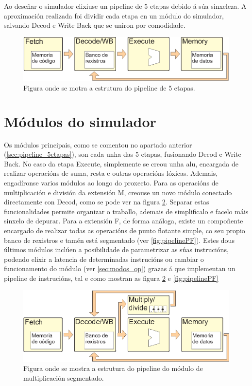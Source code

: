 Ao deseñar o simulador elixiuse un pipeline de 5 etapas debido á súa sinxeleza. A aproximación realizada foi dividir cada etapa en un módulo do simulador, salvando Decod e Write Back que se uniron por comodidade.

\begin{figure}[hp!]
  \centering
  \includegraphics[width=\textwidth]{imaxes/pipeline5etapas.EPS}
  \caption{Figura onde se motra a estrutura do pipeline de 5 etapas.}
  \label{fig:pipeline5etapas}
\end{figure}

\section{Módulos do simulador}\label{sec:modulo_sim}
Os módulos principais, como se comentou no apartado anterior (\ref{sec:pipeline_5etapas}), son cada unha das 5 etapas, fusionando Decod e Write Back. No caso da etapa Execute, simplemente se creou unha \acrshort{alu}, encargada de realizar operacións de suma, resta e outras operacións lóxicas. Ademais, engadíronse varios módulos ao longo do proxecto. Para as operacións de multiplicación e división da extensión M, creouse un novo módulo conectado directamente con Decod, como se pode ver na figura \ref{fig:pipelineMultSegm}. Separar estas funcionalidades permite organizar o traballo, ademais de simplificalo e facelo máis sinxelo de depurar. Para a extensión F, de forma análoga, existe un compoñente encargado de realizar todas as operacións de punto flotante simple, co seu propio banco de rexistros e tamén está segmentado (ver \ref{fig:pipelinePF}). Estes dous últimos módulos inclúen a posibilidade de parametrizar as súas instrucións, podendo elixir a latencia de determinadas instrucións ou cambiar o funcionamento do módulo (ver \ref{sec:modos_op}) grazas á que implementan un pipeline de instrucións, tal e como mostran as figura \ref{fig:pipelineMultSegm} e \ref{fig:pipelinePF}

\begin{figure}[hp!]
  \centering
  \includegraphics[width=\textwidth]{imaxes/pipelineMultSegm.EPS}
  \caption{Figura onde se mostra a estrutura do pipeline do módulo de multiplicación segmentado.}
  \label{fig:pipelineMultSegm}
\end{figure}

